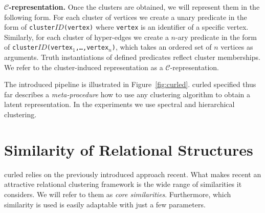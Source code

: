 \textbf{$\mathcal{C}$-representation.}
Once the clusters are obtained, we will represent them in the following form.
For each cluster of vertices we create a unary predicate in the form of \texttt{cluster$ID$(vertex)} where \texttt{vertex} is an identifier of a specific vertex.
Similarly, for each cluster of hyper-edges we create a $n$-ary predicate in the form of \texttt{cluster$ID$(vertex$_1$,\ldots,vertex$_n$)}, which takes an ordered set of $n$ vertices as arguments.
Truth instantiations of defined predicates reflect cluster memberships.
We refer to the cluster-induced representation as a $\mathcal{C}$-representation.





The introduced pipeline is illustrated in Figure~\ref{fig:curled}.
\gls{curled} specified thus far describes a \textit{meta-procedure} how to use any clustering algorithm to obtain a latent representation.
In the experiments we use spectral and hierarchical clustering.



\section{Similarity of Relational Structures}
\label{sec:Clustering}


\gls{curled} relies on the previously introduced approach \gls{recent}.
What makes \gls{recent} an attractive relational clustering framework is the wide range of similarities it considers.
We will refer to them as \textit{core similarities}.
Furthermore, which similarity is used is easily adaptable with just a few parameters.





